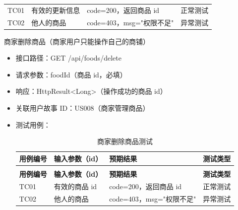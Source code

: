 \begin{levellist}
\begin{levellist}
\begin{itemize}
\begin{longtable}{>{\centering\arraybackslash}m{1.7cm} >{\centering\arraybackslash}m{3cm} >{\centering\arraybackslash}m{6.3cm} >{\centering\arraybackslash}m{2cm}}
                      TC01          & 有效的更新信息           & code=200，返回商品 id    & 正常测试          \\
                      TC02          & 他人的商品             & code=403，msg="权限不足" & 异常测试          \\
                  \end{longtable}
        \end{itemize}

        \item 商家删除商品（商家用户只能操作自己的商铺）
        \begin{itemize}
            \item 接口路径：GET /api/foods/delete
            \item 请求参数：foodId（商品 id，必填）
            \item 响应：HttpResult<Long>（操作成功的商品 id）
            \item 关联用户故事 ID：US008（商家管理商品）
            \item 测试用例：
                  \begin{longtable}{>{\centering\arraybackslash}m{1.7cm} >{\centering\arraybackslash}m{3cm} >{\centering\arraybackslash}m{6.3cm} >{\centering\arraybackslash}m{2cm}}

                      \caption{商家删除商品测试} \label{tab:training}                                 \\

                      \toprule
                      \textbf{用例编号} & \textbf{输入参数（id）} & \textbf{预期结果}       & \textbf{测试类型} \\
                      \midrule
                      \endfirsthead

                      \multicolumn{4}{c}{{\tablename\ \thetable{} 续表}}                        \\
                      \toprule
                      \textbf{用例编号} & \textbf{输入参数（id）} & \textbf{预期结果}       & \textbf{测试类型} \\
                      \midrule
                      \endhead

                      \bottomrule
                      \endfoot

                      TC01          & 有效的商品 id          & code=200，返回商品 id    & 正常测试          \\
                      TC02          & 他人的商品             & code=403，msg="权限不足" & 异常测试          \\
                  \end{longtable}
        \end{itemize}


\end{levellist}
\end{levellist}
